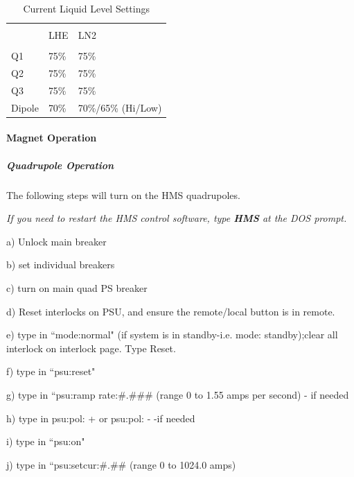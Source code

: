 {\begin{table}
\begin{center}
\caption{Current Liquid Level Settings\label{tab:liq_levels}}
\vspace{\baselineskip}
\begin{tabular}{|l|l|l|}
\hline
{} & {}  & {}  \\
{} & LHE & LN2 \\
{} & {}  & {}  \\ \hline
Q1  & 75\% & 75\% \\
Q2  & 75\% & 75\% \\
Q3  & 75\% & 75\% \\
Dipole& 70\% & 70\%/65\% (Hi/Low) \\
\hline
\end{tabular}
\end{center}
\end{table}

\paragraph{Magnet Operation}

\subparagraph{Quadrupole Operation}

\begin{description}
\item{}\hskip0.3in The following steps will turn on the HMS
quadrupoles.
\end{description}
{\sl If you need to restart the HMS control software, type {\bf HMS} at the DOS prompt.}

\begin{description}
\item{}\hskip0.5in a) Unlock main breaker
\item{}\hskip0.5in b) set individual breakers
\item{}\hskip0.5in c) turn on main quad PS breaker
\item{}\hskip0.5in d) Reset interlocks on PSU, and ensure the
remote/local button is in remote.
\item{}\hskip0.5in e) type in ``mode:normal" (if system is in
standby-i.e. mode: standby);clear all interlock on interlock
page.  Type Reset.
\item{}\hskip0.5in f) type in ``psu:reset"
\item{}\hskip0.5in g) type in ``psu:ramp rate:\#.\#\#\# (range 0 to 1.55
amps per second)
- if needed
\item{}\hskip0.5in {h) type in psu:pol: + or psu:pol: - \quad -if needed}
\item{}\hskip0.5in i) type in ``psu:on"
\item{}\hskip0.5in j) type in ``psu:setcur:\#.\#\# (range 0 to 1024.0 amps)
\end{description}

}
